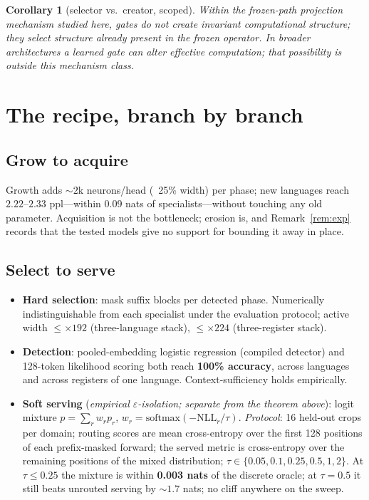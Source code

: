 \documentclass[11pt]{article}
\newtheorem{corollary}{Corollary}
\theoremstyle{definition}\newtheorem{definition}{Definition}
\theoremstyle{remark}\newtheorem{remark}{Remark}
\begin{document}
\begin{corollary}[selector vs.\ creator, scoped]\label{cor:sel}
Within the frozen-path projection mechanism studied here, gates do not create invariant
computational structure; they select structure already present in the frozen operator. In
broader architectures a learned gate can alter effective computation; that possibility is
outside this mechanism class.
\end{corollary}

\section{The recipe, branch by branch}
\label{sec:recipe}

\subsection{Grow to acquire}
Growth adds ${\sim}2$k neurons/head (~25\% width) per phase; new languages reach
$2.22$--$2.33$ ppl---within 0.09 nats of specialists---without touching any old parameter.
Acquisition is not the bottleneck; erosion is, and Remark~\ref{rem:exp} records that the
tested models give no support for bounding it away in place.

\subsection{Select to serve}
\label{sec:serve}
\begin{itemize}\itemsep2pt
\item \textbf{Hard selection}: mask suffix blocks per detected phase. Numerically
indistinguishable from each specialist under the evaluation protocol; active width
$\le\times192$ (three-language stack), $\le\times224$ (three-register stack).
\item \textbf{Detection}: pooled-embedding logistic regression (compiled detector) and
128-token likelihood scoring both reach \textbf{100\% accuracy}, across languages and across
registers of one language. Context-sufficiency holds empirically.
\item \textbf{Soft serving} (\emph{empirical $\varepsilon$-isolation; separate from the
theorem above}): logit mixture $p=\sum_r w_r p_r$,
$w_r=\mathrm{softmax}(-\mathrm{NLL}_r/\tau)$. \emph{Protocol}: 16 held-out crops per domain;
routing scores are mean cross-entropy over the first 128 positions of each prefix-masked
forward; the served metric is cross-entropy over the remaining positions of the mixed
distribution; $\tau\in\{0.05,0.1,0.25,0.5,1,2\}$. At $\tau\le0.25$ the mixture is within
\textbf{0.003 nats} of the discrete oracle; at $\tau=0.5$ it still beats unrouted serving by
${\sim}1.7$ nats; no cliff anywhere on the sweep.
\end{itemize}
\end{document}
